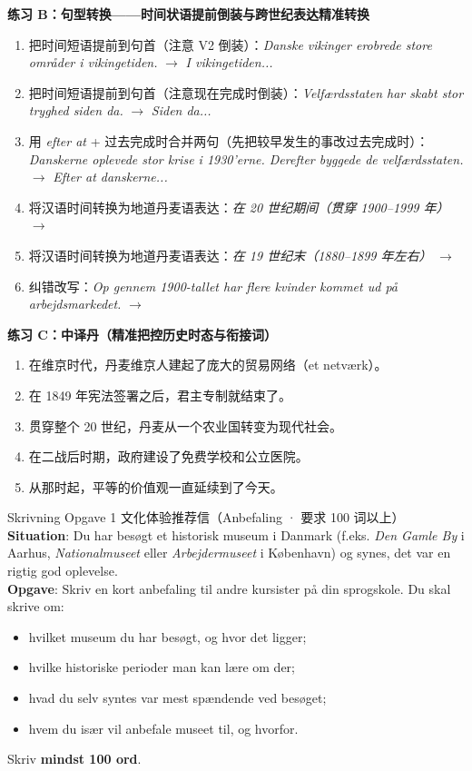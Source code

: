 \textbf{练习 B：句型转换——时间状语提前倒装与跨世纪表达精准转换}
\begin{enumerate}
  \item 把时间短语提前到句首（注意 V2 倒装）：\textit{Danske vikinger erobrede store områder i vikingetiden.} $\rightarrow$ \textit{I vikingetiden...}
  \item 把时间短语提前到句首（注意现在完成时倒装）：\textit{Velfærdsstaten har skabt stor tryghed siden da.} $\rightarrow$ \textit{Siden da...}
  \item 用 \textit{efter at} + 过去完成时合并两句（先把较早发生的事改过去完成时）：\textit{Danskerne oplevede stor krise i 1930'erne. Derefter byggede de velfærdsstaten.} $\rightarrow$ \textit{Efter at danskerne...}
  \item 将汉语时间转换为地道丹麦语表达：\textit{在 20 世纪期间（贯穿 1900--1999 年）} $\rightarrow$ \underline{\hspace{3.0cm}}
  \item 将汉语时间转换为地道丹麦语表达：\textit{在 19 世纪末（1880--1899 年左右）} $\rightarrow$ \underline{\hspace{3.2cm}}
  \item 纠错改写：\textit{Op gennem 1900-tallet har flere kvinder kommet ud på arbejdsmarkedet.} $\rightarrow$
\end{enumerate}

\textbf{练习 C：中译丹（精准把控历史时态与衔接词）}
\begin{enumerate}
  \item 在维京时代，丹麦维京人建起了庞大的贸易网络（et netværk）。
  \item 在 1849 年宪法签署之后，君主专制就结束了。
  \item 贯穿整个 20 世纪，丹麦从一个农业国转变为现代社会。
  \item 在二战后时期，政府建设了免费学校和公立医院。
  \item 从那时起，平等的价值观一直延续到了今天。
\end{enumerate}


\begin{emailbox}{Skrivning Opgave 1 文化体验推荐信（Anbefaling · 要求 100 词以上）}
\textbf{Situation}: Du har besøgt et historisk museum i Danmark (f.eks. \textit{Den Gamle By} i Aarhus, \textit{Nationalmuseet} eller \textit{Arbejdermuseet} i København) og synes, det var en rigtig god oplevelse.\\
\textbf{Opgave}: Skriv en kort anbefaling til andre kursister på din sprogskole. Du skal skrive om:
\begin{itemize}
  \item hvilket museum du har besøgt, og hvor det ligger;
  \item hvilke historiske perioder man kan lære om der;
  \item hvad du selv syntes var mest spændende ved besøget;
  \item hvem du især vil anbefale museet til, og hvorfor.
\end{itemize}
Skriv \textbf{mindst 100 ord}.
\end{emailbox}

